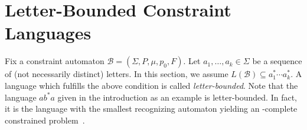 

\section{Letter-Bounded Constraint Languages}
\label{sec:strictly_bounded_case}












 
 
 Fix a constraint automaton $\mathcal B = (\Sigma, P, \mu, p_0, F)$.
 Let $a_1, \ldots, a_k \in \Sigma$ be a sequence of (not necessarily distinct)
 letters.
 In this section, we assume $L(\mathcal B) \subseteq a_1^* \cdots a_k^*$.
 A language which fulfills the above condition
 is called \emph{letter-bounded}.
 Note that the language $ab^*a$ given in the introduction as an example
 is letter-bounded. In fact, it is the language with the smallest
 recognizing automaton yielding an \NP-complete constrained problem~\cite{DBLP:conf/mfcs/FernauGHHVW19}.
 
